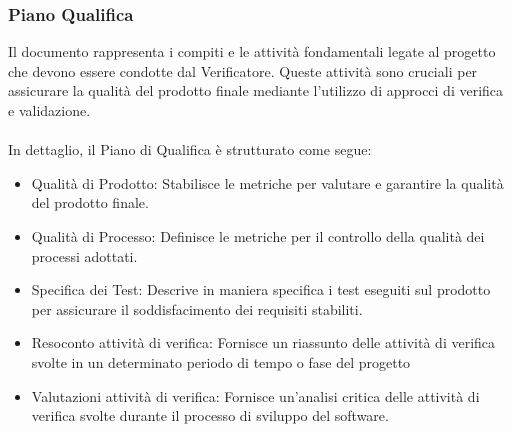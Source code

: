 \documentclass{article}
\begin{document}
\subsubsection{Piano Qualifica}
Il documento rappresenta i compiti e le attività fondamentali legate al progetto che devono essere condotte dal Verificatore. Queste attività sono cruciali per assicurare la qualità del prodotto finale mediante l'utilizzo di approcci di verifica e validazione.\\\\
In dettaglio, il Piano di Qualifica è strutturato come segue:
\begin{itemize}
    \item Qualità di Prodotto: Stabilisce le metriche per valutare e garantire la qualità del prodotto finale.
    \item Qualità di Processo: Definisce le metriche per il controllo della qualità dei processi adottati.
    \item Specifica dei Test: Descrive in maniera specifica i test eseguiti sul prodotto per assicurare il soddisfacimento dei requisiti stabiliti.
    \item Resoconto attività di verifica: Fornisce un riassunto delle attività di verifica svolte in un determinato periodo di tempo o fase del progetto
    \item Valutazioni attività di verifica: Fornisce un'analisi critica delle attività di verifica svolte durante il processo di sviluppo del software.
\end{itemize}
\end{document}
